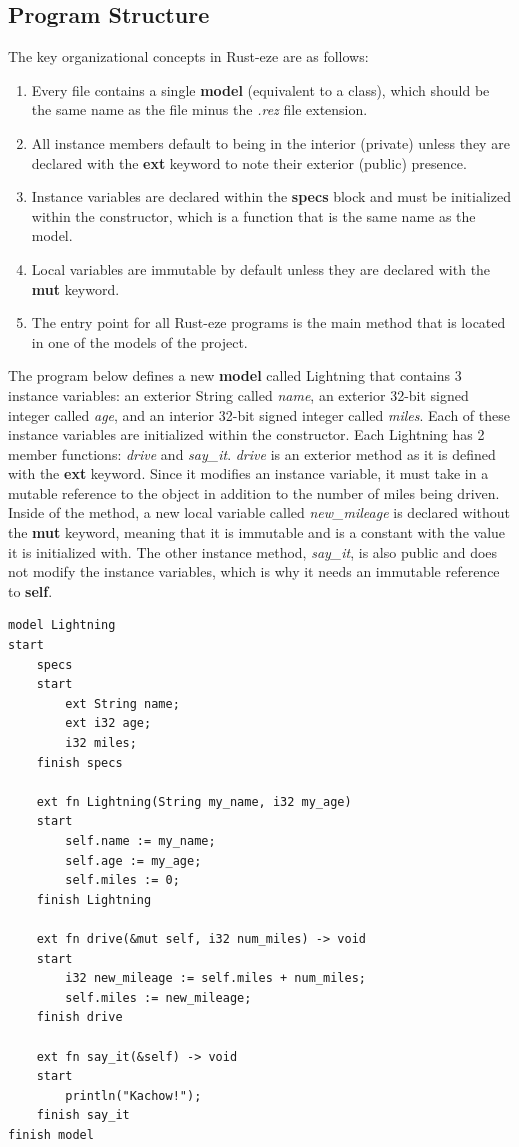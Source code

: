 \documentclass[letterpaper, 10pt, DIV=13]{scrartcl}
\numberwithin{equation}{section}
\numberwithin{figure}{section}
\numberwithin{table}{section}
\begin{document}
\subsection{Program Structure}
The key organizational concepts in Rust-eze are as follows:
\begin{enumerate}
    \item Every file contains a single \textbf{model} (equivalent to a class),
          which should be the same name as the file minus the \textit{.rez} file
          extension.
      \item All instance members default to being in the interior (private) unless they 
          are declared with the \textbf{ext} keyword to note their exterior (public) presence.
    \item Instance variables are declared within the \textbf{specs} block and
          must be initialized within the constructor, which is a function that
          is the same name as the model.
    \item Local variables are immutable by default unless they are declared with
          the \textbf{mut} keyword.
    \item The entry point for all Rust-eze programs is the main method that is
          located in one of the models of the project.
\end{enumerate}

The program below defines a new \textbf{model} called Lightning that contains
3 instance variables: an exterior String called \textit{name}, an exterior
32-bit signed integer called \textit{age}, and an interior 32-bit signed integer called \textit{miles}. Each
of these instance variables are initialized within the constructor. Each
Lightning has 2 member functions: \textit{drive} and \textit{say\_it}.
\textit{drive} is an exterior method as it is defined with the \textbf{ext}
keyword. Since it modifies an instance variable, it must take in a mutable
reference to the object in addition to the number of miles being driven. Inside
of the method, a new local variable called \textit{new\_mileage} is declared
without the \textbf{mut} keyword, meaning that it is immutable and is a constant
with the value it is initialized with. The other instance method,
\textit{say\_it}, is also public and does not modify the instance variables,
which is why it needs an immutable reference to \textbf{self}.

\begin{lstlisting}[caption = Lightning.rez, frame = single, nolol]
model Lightning
start
    specs
    start
        ext String name;
        ext i32 age;
        i32 miles;
    finish specs

    ext fn Lightning(String my_name, i32 my_age)
    start
        self.name := my_name;
        self.age := my_age;
        self.miles := 0;
    finish Lightning

    ext fn drive(&mut self, i32 num_miles) -> void
    start
        i32 new_mileage := self.miles + num_miles;
        self.miles := new_mileage;
    finish drive

    ext fn say_it(&self) -> void
    start
        println("Kachow!");
    finish say_it
finish model
\end{lstlisting}
\end{document}
